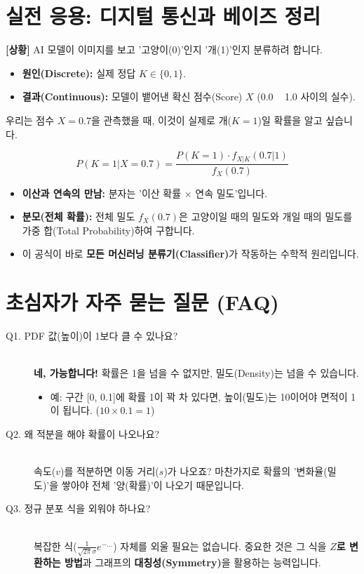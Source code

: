 \documentclass[11pt,a4paper]{book}
\theoremstyle{definition}
\begin{document}
\section{실전 응용: 디지털 통신과 베이즈 정리}

\textbf{[상황]} AI 모델이 이미지를 보고 '고양이(0)'인지 '개(1)'인지 분류하려 합니다.
\begin{itemize}
    \item \textbf{원인(Discrete):} 실제 정답 $K \in \{0, 1\}$.
    \item \textbf{결과(Continuous):} 모델이 뱉어낸 확신 점수(Score) $X$ (0.0 ~ 1.0 사이의 실수).
\end{itemize}
우리는 점수 $X=0.7$을 관측했을 때, 이것이 실제로 개($K=1$)일 확률을 알고 싶습니다.

\[ P(K=1 | X=0.7) = \frac{P(K=1) \cdot f_{X|K}(0.7|1)}{f_X(0.7)} \]

\begin{itemize}
    \item \textbf{이산과 연속의 만남:} 분자는 '이산 확률 $\times$ 연속 밀도'입니다.
    \item \textbf{분모(전체 확률):} 전체 밀도 $f_X(0.7)$은 고양이일 때의 밀도와 개일 때의 밀도를 가중 합(Total Probability)하여 구합니다.
    \item 이 공식이 바로 \textbf{모든 머신러닝 분류기(Classifier)}가 작동하는 수학적 원리입니다.
\end{itemize}

\section{초심자가 자주 묻는 질문 (FAQ)}

\begin{description}
    \item[Q1. PDF 값(높이)이 1보다 클 수 있나요?] \hfill \\
    \textbf{네, 가능합니다!} 확률은 1을 넘을 수 없지만, 밀도(Density)는 넘을 수 있습니다.
    \begin{itemize}
        \item 예: 구간 [0, 0.1]에 확률 1이 꽉 차 있다면, 높이(밀도)는 10이어야 면적이 1이 됩니다. ($10 \times 0.1 = 1$)
    \end{itemize}
    
    \item[Q2. 왜 적분을 해야 확률이 나오나요?] \hfill \\
    속도($v$)를 적분하면 이동 거리($s$)가 나오죠? 마찬가지로 확률의 '변화율(밀도)'을 쌓아야 전체 '양(확률)'이 나오기 때문입니다.
    
    \item[Q3. 정규 분포 식을 외워야 하나요?] \hfill \\
    복잡한 식($\frac{1}{\sqrt{2\pi}\sigma}e^{-\dots}$) 자체를 외울 필요는 없습니다. 중요한 것은 그 식을 \textbf{$Z$로 변환하는 방법}과 그래프의 \textbf{대칭성(Symmetry)}을 활용하는 능력입니다.
\end{description}
\end{document}
